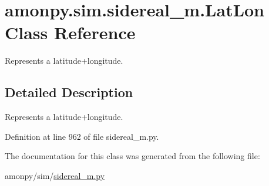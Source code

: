 \hypertarget{classamonpy_1_1sim_1_1sidereal__m_1_1_lat_lon}{\section{amonpy.\-sim.\-sidereal\-\_\-m.\-Lat\-Lon Class Reference}
\label{classamonpy_1_1sim_1_1sidereal__m_1_1_lat_lon}
}


Represents a latitude+longitude.  




\subsection{Detailed Description}
Represents a latitude+longitude. 

Definition at line 962 of file sidereal\-\_\-m.\-py.



The documentation for this class was generated from the following file\-:\begin{DoxyCompactItemize}
\item 
amonpy/sim/\hyperlink{sidereal__m_8py}{sidereal\-\_\-m.\-py}\end{DoxyCompactItemize}
